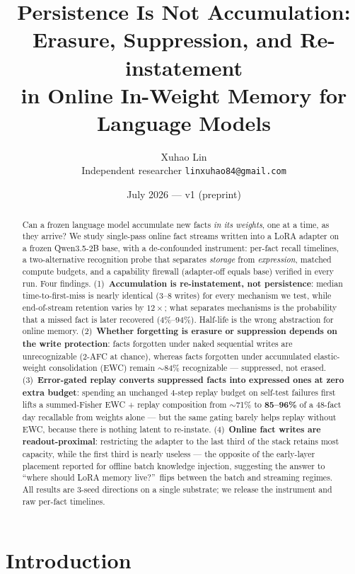 \documentclass[11pt]{article}
\title{Persistence Is Not Accumulation:\\ Erasure, Suppression, and Re-instatement\\ in Online In-Weight Memory for Language Models}
\author{Xuhao Lin\\ \small Independent researcher \quad \texttt{linxuhao84@gmail.com}}
\date{July 2026 --- v1 (preprint)}
\newcommand{\qwen}{Qwen3.5-2B}
\begin{document}
\maketitle

\begin{abstract}
Can a frozen language model accumulate new facts \emph{in its weights}, one at a time, as they arrive?
We study single-pass online fact streams written into a LoRA adapter on a frozen \qwen{} base, with a
de-confounded instrument: per-fact recall timelines, a two-alternative recognition probe that separates
\emph{storage} from \emph{expression}, matched compute budgets, and a capability firewall (adapter-off
equals base) verified in every run. Four findings. (1)~\textbf{Accumulation is re-instatement, not
persistence}: median time-to-first-miss is nearly identical (3--8 writes) for every mechanism we test,
while end-of-stream retention varies by $12\times$; what separates mechanisms is the probability that a
missed fact is later recovered (4\%--94\%). Half-life is the wrong abstraction for online memory.
(2)~\textbf{Whether forgetting is erasure or suppression depends on the write protection}: facts
forgotten under naked sequential writes are unrecognizable (2-AFC at chance), whereas facts forgotten
under accumulated elastic-weight consolidation (EWC) remain $\sim$84\% recognizable --- suppressed, not
erased. (3)~\textbf{Error-gated replay converts suppressed facts into expressed ones at zero extra
budget}: spending an unchanged 4-step replay budget on self-test failures first lifts a summed-Fisher
EWC + replay composition from $\sim$71\% to \textbf{85--96\%} of a 48-fact day recallable from weights
alone --- but the same gating barely helps replay without EWC, because there is nothing latent to
re-instate. (4)~\textbf{Online fact writes are readout-proximal}: restricting the adapter to the last
third of the stack retains most capacity, while the first third is nearly useless --- the opposite of the
early-layer placement reported for offline batch knowledge injection, suggesting the answer to ``where
should LoRA memory live?''\ flips between the batch and streaming regimes. All results are 3-seed
directions on a single substrate; we release the instrument and raw per-fact timelines.
\end{abstract}

\section{Introduction}
\end{document}
